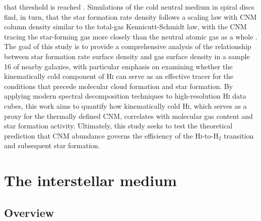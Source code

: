 that threshold is reached \citep{Fbigiel2008}. Simulations of the cold neutral medium
in spiral discs find, in turn, that the star formation rate density follows a scaling
law with CNM column density similar to the total-gas Kennicutt-Schmidt law, with the
CNM tracing the star-forming gas more closely than the neutral atomic gas as a whole
\citep{Smith2023}. The goal of this study is to provide a comprehensive analysis of the relationship between star formation rate surface density and gas surface density in a sample 16 of nearby galaxies, with particular emphasis on examining whether the kinematically cold component of \textrm{H\textsc{i}} can serve as an effective tracer for the conditions that precede molecular cloud formation and star formation. By applying modern spectral decomposition techniques to high-resolution \textrm{H\textsc{i}} data cubes, this work aims to quantify how kinematically cold \textrm{H\textsc{i}}, which serves as a proxy for the thermally defined CNM, correlates with molecular gas content and star formation activity. Ultimately, this study seeks to test the theoretical prediction that CNM abundance governs the efficiency of the \textrm{H\textsc{i}}-to-H$_2$ transition and subsequent star formation.


\section{The interstellar medium}
\subsection{Overview}

